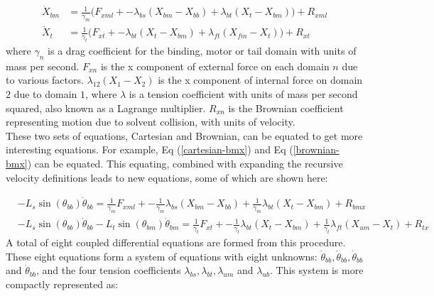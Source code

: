\documentclass[9pt,twoside,lineno]{pnas-new}
\begin{document}
\begin{align}  
  \dot{X}_{bm} &= \frac{1}{\gamma_m} \Big(F_{xml} + - \lambda_{bs}(X_{bm} - X_{bb}) + \lambda_{bt}(X_{t } - X_{bm}) \Big) + R_{xml} \label{brownian-bmx}\\
  \dot{X}_{t } &= \frac{1}{\gamma_t} \Big(F_{xt } + - \lambda_{bt}(X_{t } - X_{bm}) + \lambda_{ft}(X_{fm} - X_{t }) \Big) + R_{xt }
\end{align}
%
where $\gamma_n$ is a drag coefficient for the binding, motor or tail domain with units of mass per second. $F_{xn}$ is the x component of external force on each domain $n$ due to various factors. $\lambda_{12}\left(X_1 - X_2\right)$ is the x component of internal force on domain $2$ due to domain $1$, where $\lambda$ is a tension coefficient with units of mass per second squared, also known as a Lagrange multiplier. $R_{xn}$ is the Brownian coefficient representing motion due to solvent collision, with units of velocity.\\

These two sets of equations, Cartesian and Brownian, can be equated to get more interesting equations. For example, Eq (\ref{cartesian-bmx}) and Eq (\ref{brownian-bmx}) can be equated. This equating, combined with expanding the recursive velocity definitions leads to new equations, some of which are shown here:

\begin{align}
  &-L_s\sin(\theta_{bb})\dot{\theta}_{bb} = \frac{1}{\gamma_m}F_{xml} + -\frac{1}{\gamma_m}\lambda_{bs}(X_{bm} - X_{bb}) + \frac{1}{\gamma_m}\lambda_{bt}(X_{t } - X_{bm}) + R_{bmx} \label{ob_system_first}\\
  &-L_s\sin(\theta_{bb})\dot{\theta}_{bb} - L_t\sin(\theta_{bm})\dot{\theta}_{bm} = \frac{1}{\gamma_t}F_{xt } + -\frac{1}{\gamma_t}\lambda_{bt}(X_{t } - X_{bm}) + \frac{1}{\gamma_t}\lambda_{ft}(X_{um} - X_{t }) + R_{tx}\label{ob_system_second}
\end{align}
%
A total of eight coupled differential equations are formed from this procedure. These eight equations form a system of equations with eight unknowns: $\dot{\theta}_{bb}, \dot{\theta}_{bb}, \dot{\theta}_{bb}$ and $\dot{\theta}_{bb}$, and the four tension coefficients $\lambda_{bs}, \lambda_{bt}, \lambda_{um}$ and $\lambda_{ub}$. This system is more compactly represented as:
\end{document}
